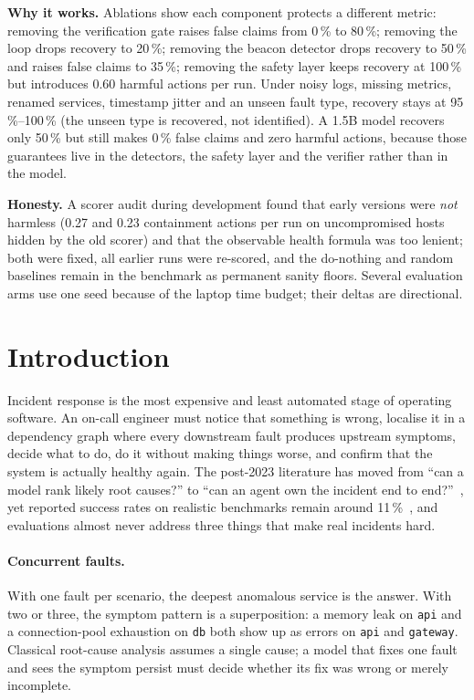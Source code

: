 \documentclass[11pt,a4paper]{article}
\newcommand{\code}[1]{\texttt{#1}}
\newcommand{\pct}[1]{#1\,\%}
\begin{document}
\textbf{Why it works.} Ablations show each component protects a different metric: removing the
verification gate raises false claims from \pct{0} to \pct{80}; removing the loop drops recovery
to \pct{20}; removing the beacon detector drops recovery to \pct{50} and raises false claims to
\pct{35}; removing the safety layer keeps recovery at \pct{100} but introduces 0.60 harmful actions
per run. Under noisy logs, missing metrics, renamed services, timestamp jitter and an unseen fault
type, recovery stays at \pct{95}--\pct{100} (the unseen type is recovered, not identified). A 1.5B model recovers only \pct{50} but still makes
\pct{0} false claims and zero harmful actions, because those guarantees live in the detectors,
the safety layer and the verifier rather than in the model.

\textbf{Honesty.} A scorer audit during development found that early versions were \emph{not}
harmless (0.27 and 0.23 containment actions per run on uncompromised hosts hidden by the old
scorer) and that the observable health formula was too lenient; both were fixed, all earlier runs
were re-scored, and the do-nothing and random baselines remain in the benchmark as permanent
sanity floors. Several evaluation arms use one seed because of the laptop time budget; their
deltas are directional.

\clearpage
\tableofcontents
\clearpage
\pagestyle{fancy}

\section{Introduction}

Incident response is the most expensive and least automated stage of operating software. An
on-call engineer must notice that something is wrong, localise it in a dependency graph where every
downstream fault produces upstream symptoms, decide what to do, do it without making things worse,
and confirm that the system is actually healthy again. The post-2023 literature has moved from
``can a model rank likely root causes?'' to ``can an agent own the incident end to
end?''~\cite{aiopslab,itbench,stratus}, yet reported success rates on realistic benchmarks remain
around \pct{11}~\cite{openrca,itbench}, and evaluations almost never address three things that make
real incidents hard.

\paragraph{Concurrent faults.} With one fault per scenario, the deepest anomalous service is the
answer. With two or three, the symptom pattern is a superposition: a memory leak on \code{api} and a
connection-pool exhaustion on \code{db} both show up as errors on \code{api} and \code{gateway}.
Classical root-cause analysis assumes a single cause; a model that fixes one fault and sees the
symptom persist must decide whether its fix was wrong or merely incomplete.
\end{document}
